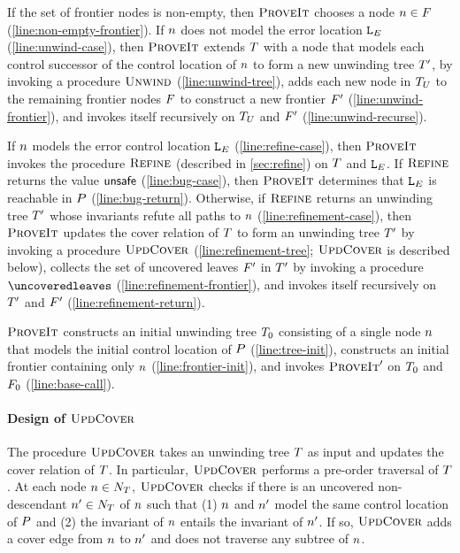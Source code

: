 If the set of frontier nodes is non-empty, then $\textsc{ProveIt}$
chooses a node $n \in F$
(\autoref{line:non-empty-frontier}).
If $n$ does not model the error location $\mathtt{L}_E$
(\autoref{line:unwind-case}), then $\textsc{ProveIt}$ extends
$T$ with a node that models each control successor of the
control location of $n$ to form a new unwinding tree $T'$,
by invoking a procedure $\textsc{Unwind}$ (\autoref{line:unwind-tree}), adds
each new node in $T_U$ to the remaining frontier nodes
$F$ to construct a new frontier $F'$
(\autoref{line:unwind-frontier}), and invokes itself recursively on
$T_U$ and $F'$ (\autoref{line:unwind-recurse}).

If $n$ models the error control location $\mathtt{L}_E$
(\autoref{line:refine-case}), then $\textsc{ProveIt}$ invokes the procedure
$\textsc{Refine}$ (described in \autoref{sec:refine}) on $T$ and
$\mathtt{L}_E$.
%
If $\textsc{Refine}$ returns the value $\mathsf{unsafe}$
(\autoref{line:bug-case}), then $\textsc{ProveIt}$ determines
that $\mathtt{L}_E$ is reachable in $P$ (\autoref{line:bug-return}).
%
Otherwise, if $\textsc{Refine}$ returns an unwinding tree $T'$ whose
invariants refute all paths to $n$
(\autoref{line:refinement-case}), then $\textsc{ProveIt}$ updates the cover
relation of $T$ to form an unwinding tree $T'$ by invoking
a procedure $\textsc{UpdCover}$ (\autoref{line:refinement-tree}; $\textsc{UpdCover}$
is described below),
%
collects the set of uncovered leaves $F'$ in $T'$ by
invoking a procedure $\uncoveredleaves$
(\autoref{line:refinement-frontier}), and invokes itself recursively
on $T'$ and $F'$ (\autoref{line:refinement-return}).

$\textsc{ProveIt}$ constructs an initial unwinding tree $T_0$
consisting of a single node $n$ that models the initial control
location of $P$ (\autoref{line:tree-init}), constructs an
initial frontier containing only $n$
(\autoref{line:frontier-init}), and invokes $\textsc{ProveIt}'$ on
$T_0$ and $F_0$ (\autoref{line:base-call}).

\paragraph{Design of $\textsc{UpdCover}$}
%
The procedure $\textsc{UpdCover}$ takes an unwinding tree $T$ as input
and updates the cover relation of $T$.
%
In particular, $\textsc{UpdCover}$ performs a pre-order traversal of
$T$.
%
At each node $n \in N_{T}$, $\textsc{UpdCover}$ checks if
there is an uncovered non-descendant $n' \in N_{T}$
of $n$ such that (1) $n$ and $n'$ model the same
control location of $P$ and (2) the invariant of $n$
entails the invariant of $n'$.
%
If so, $\textsc{UpdCover}$ adds a cover edge from $n$ to $n'$ and
does not traverse any subtree of $n$.

